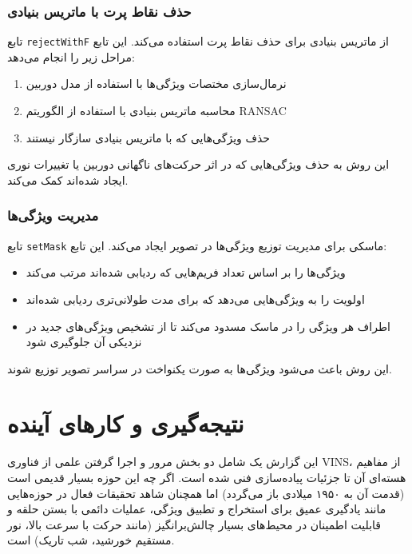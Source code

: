 \documentclass[11pt, a4paper]{article}
\begin{document}
	\subsubsection{حذف نقاط پرت با ماتریس بنیادی}
	\label{subsubsec:outlier_rejection}
	
	تابع \texttt{rejectWithF} از ماتریس بنیادی برای حذف نقاط پرت استفاده می‌کند. این تابع مراحل زیر را انجام می‌دهد:
	
	\begin{enumerate}
		\item نرمال‌سازی مختصات ویژگی‌ها با استفاده از مدل دوربین
		\item محاسبه ماتریس بنیادی با استفاده از الگوریتم \gls{RANSAC}
		\item حذف ویژگی‌هایی که با ماتریس بنیادی سازگار نیستند
	\end{enumerate}
	
	این روش به حذف ویژگی‌هایی که در اثر حرکت‌های ناگهانی دوربین یا تغییرات نوری ایجاد شده‌اند کمک می‌کند.
	
	\subsubsection{مدیریت ویژگی‌ها}
	\label{subsubsec:feature_management}
	
	تابع \texttt{setMask} ماسکی برای مدیریت توزیع ویژگی‌ها در تصویر ایجاد می‌کند. این تابع:
	
	\begin{itemize}
		\item ویژگی‌ها را بر اساس تعداد فریم‌هایی که ردیابی شده‌اند مرتب می‌کند
		\item اولویت را به ویژگی‌هایی می‌دهد که برای مدت طولانی‌تری ردیابی شده‌اند
		\item اطراف هر ویژگی را در ماسک مسدود می‌کند تا از تشخیص ویژگی‌های جدید در نزدیکی آن جلوگیری شود
	\end{itemize}
	
	این روش باعث می‌شود ویژگی‌ها به صورت یکنواخت در سراسر تصویر توزیع شوند.
	
	
	\section{نتیجه‌گیری و کارهای آینده}
	این گزارش یک شامل دو بخش مرور و اجرا گرفتن علمی از فناوری \gls{VINS}، از مفاهیم هسته‌ای آن تا جزئیات پیاده‌سازی فنی شده است. اگر چه این حوزه بسیار قدیمی است (قدمت آن به ۱۹۵۰ میلادی باز می‌گردد) اما همچنان شاهد تحقیقات فعال در حوزه‌هایی مانند یادگیری عمیق برای استخراج و تطبیق ویژگی، عملیات دائمی با بستن حلقه و قابلیت اطمینان در محیط‌های بسیار چالش‌برانگیز (مانند حرکت با سرعت بالا، نور مستقیم خورشید، شب تاریک) است.
\end{document}
